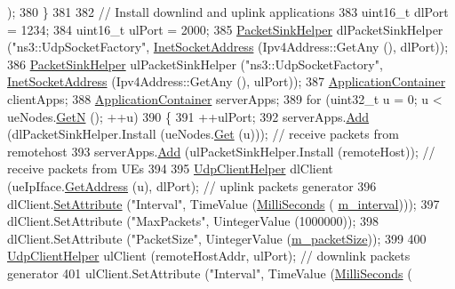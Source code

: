 \begin{DoxyCode}
      );  
380     \}
381 
382   \textcolor{comment}{// Install downlind and uplink applications}
383   uint16\_t dlPort = 1234;
384   uint16\_t ulPort = 2000;
385   \hyperlink{classns3_1_1PacketSinkHelper}{PacketSinkHelper} dlPacketSinkHelper (\textcolor{stringliteral}{"ns3::UdpSocketFactory"}, 
      \hyperlink{classns3_1_1InetSocketAddress}{InetSocketAddress} (Ipv4Address::GetAny (), dlPort));
386   \hyperlink{classns3_1_1PacketSinkHelper}{PacketSinkHelper} ulPacketSinkHelper (\textcolor{stringliteral}{"ns3::UdpSocketFactory"}, 
      \hyperlink{classns3_1_1InetSocketAddress}{InetSocketAddress} (Ipv4Address::GetAny (), ulPort));
387   \hyperlink{classns3_1_1ApplicationContainer}{ApplicationContainer} clientApps;
388   \hyperlink{classns3_1_1ApplicationContainer}{ApplicationContainer} serverApps;
389   \textcolor{keywordflow}{for} (uint32\_t u = 0; u < ueNodes.\hyperlink{classns3_1_1NodeContainer_aed647ac56d0407a7706aba02eb44b951}{GetN} (); ++u)
390     \{
391       ++ulPort;
392       serverApps.\hyperlink{classns3_1_1ApplicationContainer_ad09ab1a1ad5849d518d5f4c262e38152}{Add} (dlPacketSinkHelper.Install (ueNodes.\hyperlink{classns3_1_1NodeContainer_a9ed96e2ecc22e0f5a3d4842eb9bf90bf}{Get} (u))); \textcolor{comment}{// receive packets from
       remotehost}
393       serverApps.\hyperlink{classns3_1_1ApplicationContainer_ad09ab1a1ad5849d518d5f4c262e38152}{Add} (ulPacketSinkHelper.Install (remoteHost));  \textcolor{comment}{// receive packets from UEs}
394 
395       \hyperlink{classns3_1_1UdpClientHelper}{UdpClientHelper} dlClient (ueIpIface.\hyperlink{classns3_1_1Ipv4InterfaceContainer_ae63208dcd222be986822937ee4aa828c}{GetAddress} (u), dlPort); \textcolor{comment}{// uplink
       packets generator}
396       dlClient.\hyperlink{classns3_1_1UdpClientHelper_a8bbae16a28f85ab3f3b5aa4642edfeae}{SetAttribute} (\textcolor{stringliteral}{"Interval"}, TimeValue (\hyperlink{group__timecivil_gaf26127cf4571146b83a92ee18679c7a9}{MilliSeconds} (
      \hyperlink{classLenaPssFfMacSchedulerTestCase1_a4b23c7d1862c043863ee73ac3480a011}{m\_interval})));
397       dlClient.SetAttribute (\textcolor{stringliteral}{"MaxPackets"}, UintegerValue (1000000));
398       dlClient.SetAttribute (\textcolor{stringliteral}{"PacketSize"}, UintegerValue (\hyperlink{classLenaPssFfMacSchedulerTestCase1_a5e893d3cb1d5019807dba8960169ca6d}{m\_packetSize}));
399 
400       \hyperlink{classns3_1_1UdpClientHelper}{UdpClientHelper} ulClient (remoteHostAddr, ulPort);           \textcolor{comment}{// downlink packets
       generator}
401       ulClient.SetAttribute (\textcolor{stringliteral}{"Interval"}, TimeValue (\hyperlink{group__timecivil_gaf26127cf4571146b83a92ee18679c7a9}{MilliSeconds} (

\end{DoxyCode}
